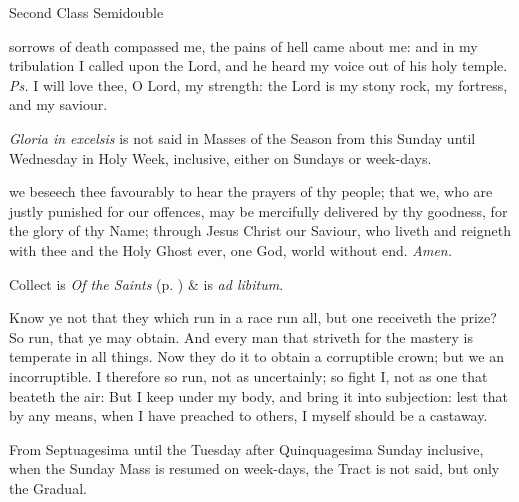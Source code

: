 \begin{inhead}
{Second Class Semidouble}
\end{inhead}

\properantiphonfix

\introit
{} sorrows of death compassed me, the pains of hell came about me: and in my tribulation I called upon the Lord, and he heard my voice out of his holy temple. \textit{Ps.} I will love thee, O Lord, my strength: the Lord is my stony rock, my fortress, and my saviour.
\begin{rubric}
    \emph{Gloria in excelsis} is not said in Masses of the Season from this Sunday until Wednesday in Holy Week, inclusive, either on Sundays or week-days.
\end{rubric}
\collect
{} we beseech thee favourably to hear the prayers of thy people; that we, who are justly punished for our offences, may be mercifully delivered by thy goodness, for the glory of thy Name; through Jesus Christ our Saviour, who liveth and reigneth with thee and the Holy Ghost ever, one God, world without end. \textit{Amen.}
\begin{rubric}
     Collect is \emph{Of the Saints} (p. \pageref{SPSaints}) \&  is \emph{ad libitum}.
\end{rubric}
 Know ye not that they which run in a race run all, but one receiveth the prize? So run, that ye may obtain. And every man that striveth for the mastery is temperate in all things. Now they do it to obtain a corruptible crown; but we an incorruptible. I therefore so run, not as uncertainly; so fight I, not as one that beateth the air: But I keep under my body, and bring it into subjection: lest that by any means, when I have preached to others, I myself should be a castaway.

\begin{rubric}
    From Septuagesima until the Tuesday after Quinquagesima Sunday inclusive, when the Sunday Mass is resumed on week-days, the Tract is not said, but only the Gradual.
\end{rubric}

